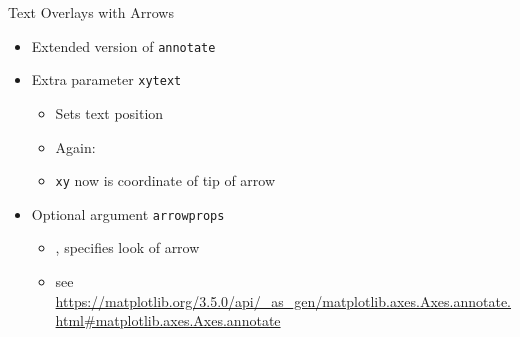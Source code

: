 \begin{frame}[fragile]{Text Overlays with Arrows}
%
\begin{itemize}
\item Extended version of \texttt{annotate}
\item Extra parameter \texttt{xytext}
	\begin{itemize}
	\item Sets text position
	\item Again: 
	\item \texttt{xy} now is coordinate of tip of arrow
	\end{itemize}
\item Optional argument \texttt{arrowprops}
	\begin{itemize}
	\item {}, specifies look of arrow
	\item see \url{https://matplotlib.org/3.5.0/api/_as_gen/matplotlib.axes.Axes.annotate.html#matplotlib.axes.Axes.annotate}
	\end{itemize}
\end{itemize}
%
\end{frame}


